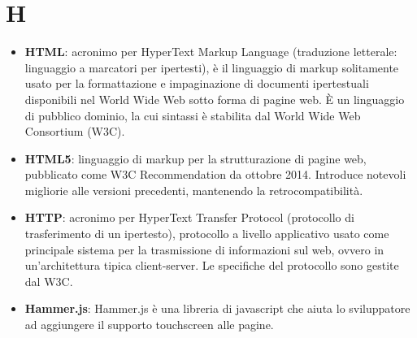 \section{H}
\begin{itemize} 
	\item \textbf{HTML}: acronimo per HyperText Markup Language (traduzione letterale: linguaggio a marcatori per ipertesti), è il linguaggio di markup solitamente usato per la formattazione e impaginazione di documenti ipertestuali disponibili nel World Wide Web sotto forma di pagine web. È un linguaggio di pubblico dominio, la cui sintassi è stabilita dal World Wide Web Consortium (W3C). 
	\item \textbf{HTML5}: linguaggio di markup per la strutturazione di pagine web, pubblicato come W3C Recommendation da ottobre 2014. Introduce notevoli migliorie alle versioni precedenti, mantenendo la retrocompatibilità.
	\item \textbf{HTTP}: acronimo per HyperText Transfer Protocol (protocollo di trasferimento di un ipertesto), protocollo a livello applicativo usato come principale sistema per la trasmissione di informazioni sul web, ovvero in un'architettura tipica client-server. Le specifiche del protocollo sono gestite dal W3C.
	\item \textbf{Hammer.js}: Hammer.js è una libreria di javascript che aiuta lo sviluppatore ad aggiungere il supporto touchscreen alle pagine.
\end{itemize}
